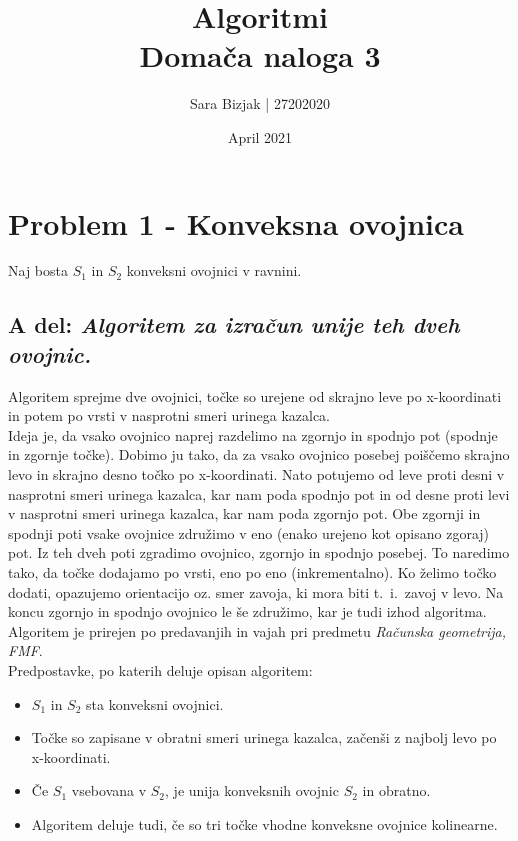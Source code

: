 \documentclass[a4paper,11pt]{article}
\title{Algoritmi \\
\textbf{Domača naloga 3} }
\author{Sara Bizjak  |  27202020}
\date{April 2021}
\begin{document}
\maketitle


\section*{Problem 1 - Konveksna ovojnica}


\noindent
Naj bosta $S_1$ in $S_2$ konveksni ovojnici v ravnini. 

\subsection*{A del: \textit{Algoritem za izračun unije teh dveh ovojnic.}} 
\noindent
Algoritem sprejme dve ovojnici, točke so urejene od skrajno leve po x-koordinati in potem po vrsti v nasprotni smeri urinega kazalca.
\\
Ideja je, da vsako ovojnico naprej razdelimo na zgornjo in spodnjo pot (spodnje in zgornje točke). 
Dobimo ju tako, da za vsako ovojnico posebej poiščemo skrajno levo in skrajno desno točko po x-koordinati. 
Nato potujemo od leve proti desni v nasprotni smeri urinega kazalca, kar nam poda spodnjo pot in od desne proti levi v nasprotni smeri urinega kazalca, kar nam poda zgornjo pot.
Obe zgornji in spodnji poti vsake ovojnice združimo v eno (enako urejeno kot opisano zgoraj) pot.
Iz teh dveh poti zgradimo ovojnico, zgornjo in spodnjo posebej. 
To naredimo tako, da točke dodajamo po vrsti, eno po eno (inkrementalno). Ko želimo točko dodati, opazujemo orientacijo oz. smer zavoja, ki mora biti t.~i.~zavoj v levo.
Na koncu zgornjo in spodnjo ovojnico le še združimo, kar je tudi izhod algoritma.
\\
Algoritem je prirejen po predavanjih in vajah pri predmetu \textit{Računska geometrija, FMF}.
\\
Predpostavke, po katerih deluje opisan algoritem:
\begin{itemize}
    \item $S_1$ in $S_2$ sta konveksni ovojnici.
    \item Točke so zapisane v obratni smeri urinega kazalca, začenši z najbolj levo po x-koordinati.
    \item Če $S_1$ vsebovana v $S_2$, je unija konveksnih ovojnic $S_2$ in obratno.
    \item Algoritem deluje tudi, če so tri točke vhodne konveksne ovojnice kolinearne.
\end{itemize}
\end{document}
